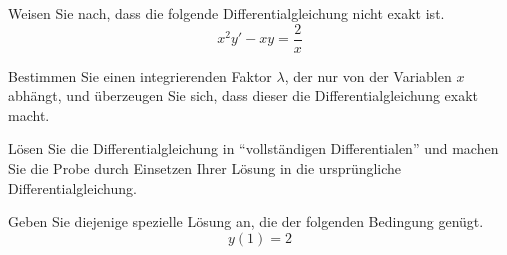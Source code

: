 \begin{atiTask}[
	title = Eine nichtexakte Differentialgleichung,
	topic = Gewöhnliche Differentialgleichungen,
	subtopic = Exakte Differentialgleichungen: Der integrierende Faktor,
	language = Deutsch,
]
	\begin{atiSubtasks}
		\item{
			Weisen Sie nach, dass die folgende Differentialgleichung nicht exakt ist.
			\[
				x^2y' - xy = \frac{2}{x}
			\]
		}
		\item{
			Bestimmen Sie einen integrierenden Faktor $\lambda$, der nur von der Variablen $x$ abhängt, und überzeugen Sie sich, dass dieser die Differentialgleichung exakt macht.
		}
		\item{
			Lösen Sie die Differentialgleichung in \enquote{vollständigen Differentialen} und machen Sie die Probe durch Einsetzen Ihrer Lösung in die ursprüngliche Differentialgleichung.
		}
		\item{
			Geben Sie diejenige spezielle Lösung an, die der folgenden Bedingung genügt.
			\[
				y(1) = 2
			\]
		}
	\end{atiSubtasks}
\end{atiTask}